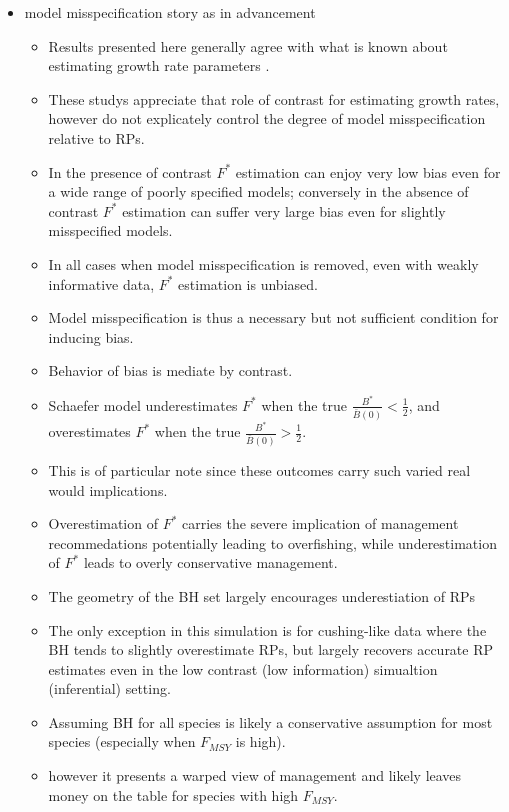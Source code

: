 \documentclass[12pt]{article}
\begin{document}
\begin{itemize}
\item model misspecification story as in advancement
	\begin{itemize}
		\item Results presented here generally agree with what is known about estimating 
		growth rate parameters .
		\item These studys appreciate that role of contrast for estimating growth rates, 
		however do not explicately control the degree of model misspecification relative to RPs. 
		\item In the presence of contrast $F^*$ estimation can enjoy very low bias even 
		for a wide range of poorly specified models; conversely in the absence of contrast 
		$F^*$ estimation can suffer very large bias even for slightly misspecified models. 
		\item In all cases when model misspecification is removed, even with weakly 
		informative data, $F^*$ estimation is unbiased.  
		\item Model misspecification is thus a necessary but not sufficient condition for inducing bias. 
		\item Behavior of bias is mediate by contrast.

		\item Schaefer model underestimates $F^*$ when the true $\frac{B^*}{\bar B(0)}<\frac{1}{2}$, %
		and overestimates $F^*$ when the true $\frac{B^*}{\bar B(0)}>\frac{1}{2}$. %
		\item This is of particular note since these outcomes carry such varied real would implications. 
		\item Overestimation of $F^*$ carries the severe implication of management 
		recommedations potentially leading to overfishing, while underestimation of $F^*$ leads to overly conservative management. 
	
		\item The geometry of the BH set largely encourages underestiation of RPs
		\item The only exception in this simulation is for cushing-like data where the BH tends to slightly overestimate RPs, but 
		largely recovers accurate RP estimates even in the low contrast (low information) simualtion (inferential) setting.
		\item Assuming BH for all species is likely a conservative assumption for most species (especially when $F_{MSY}$ is high).
		\item however it presents a warped view of management and likely leaves money on the table for species with high $F_{MSY}$.
	\end{itemize}


\end{itemize}
\end{document}
